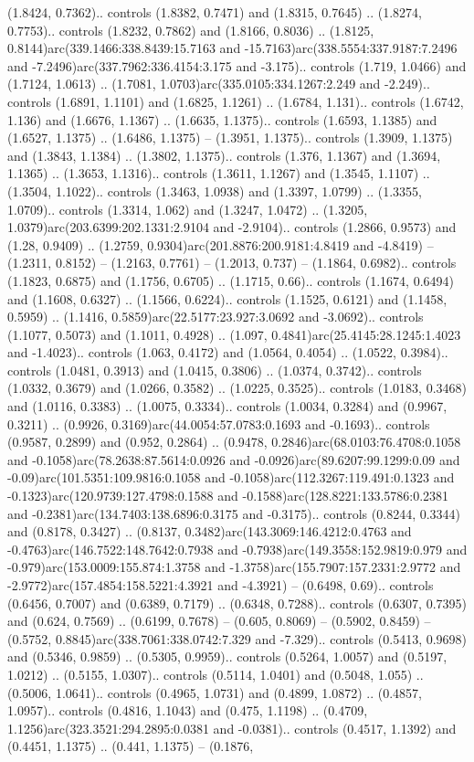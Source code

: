 (1.8424, 0.7362).. controls (1.8382, 0.7471) and (1.8315, 0.7645) .. (1.8274, 0.7753).. controls (1.8232, 0.7862) and (1.8166, 0.8036) .. (1.8125, 0.8144)arc(339.1466:338.8439:15.7163 and -15.7163)arc(338.5554:337.9187:7.2496 and -7.2496)arc(337.7962:336.4154:3.175 and -3.175).. controls (1.719, 1.0466) and (1.7124, 1.0613) .. (1.7081, 1.0703)arc(335.0105:334.1267:2.249 and -2.249).. controls (1.6891, 1.1101) and (1.6825, 1.1261) .. (1.6784, 1.131).. controls (1.6742, 1.136) and (1.6676, 1.1367) .. (1.6635, 1.1375).. controls (1.6593, 1.1385) and (1.6527, 1.1375) .. (1.6486, 1.1375) -- (1.3951, 1.1375).. controls (1.3909, 1.1375) and (1.3843, 1.1384) .. (1.3802, 1.1375).. controls (1.376, 1.1367) and (1.3694, 1.1365) .. (1.3653, 1.1316).. controls (1.3611, 1.1267) and (1.3545, 1.1107) .. (1.3504, 1.1022).. controls (1.3463, 1.0938) and (1.3397, 1.0799) .. (1.3355, 1.0709).. controls (1.3314, 1.062) and (1.3247, 1.0472) .. (1.3205, 1.0379)arc(203.6399:202.1331:2.9104 and -2.9104).. controls (1.2866, 0.9573) and (1.28, 0.9409) .. (1.2759, 0.9304)arc(201.8876:200.9181:4.8419 and -4.8419) -- (1.2311, 0.8152) -- (1.2163, 0.7761) -- (1.2013, 0.737) -- (1.1864, 0.6982).. controls (1.1823, 0.6875) and (1.1756, 0.6705) .. (1.1715, 0.66).. controls (1.1674, 0.6494) and (1.1608, 0.6327) .. (1.1566, 0.6224).. controls (1.1525, 0.6121) and (1.1458, 0.5959) .. (1.1416, 0.5859)arc(22.5177:23.927:3.0692 and -3.0692).. controls (1.1077, 0.5073) and (1.1011, 0.4928) .. (1.097, 0.4841)arc(25.4145:28.1245:1.4023 and -1.4023).. controls (1.063, 0.4172) and (1.0564, 0.4054) .. (1.0522, 0.3984).. controls (1.0481, 0.3913) and (1.0415, 0.3806) .. (1.0374, 0.3742).. controls (1.0332, 0.3679) and (1.0266, 0.3582) .. (1.0225, 0.3525).. controls (1.0183, 0.3468) and (1.0116, 0.3383) .. (1.0075, 0.3334).. controls (1.0034, 0.3284) and (0.9967, 0.3211) .. (0.9926, 0.3169)arc(44.0054:57.0783:0.1693 and -0.1693).. controls (0.9587, 0.2899) and (0.952, 0.2864) .. (0.9478, 0.2846)arc(68.0103:76.4708:0.1058 and -0.1058)arc(78.2638:87.5614:0.0926 and -0.0926)arc(89.6207:99.1299:0.09 and -0.09)arc(101.5351:109.9816:0.1058 and -0.1058)arc(112.3267:119.491:0.1323 and -0.1323)arc(120.9739:127.4798:0.1588 and -0.1588)arc(128.8221:133.5786:0.2381 and -0.2381)arc(134.7403:138.6896:0.3175 and -0.3175).. controls (0.8244, 0.3344) and (0.8178, 0.3427) .. (0.8137, 0.3482)arc(143.3069:146.4212:0.4763 and -0.4763)arc(146.7522:148.7642:0.7938 and -0.7938)arc(149.3558:152.9819:0.979 and -0.979)arc(153.0009:155.874:1.3758 and -1.3758)arc(155.7907:157.2331:2.9772 and -2.9772)arc(157.4854:158.5221:4.3921 and -4.3921) -- (0.6498, 0.69).. controls (0.6456, 0.7007) and (0.6389, 0.7179) .. (0.6348, 0.7288).. controls (0.6307, 0.7395) and (0.624, 0.7569) .. (0.6199, 0.7678) -- (0.605, 0.8069) -- (0.5902, 0.8459) -- (0.5752, 0.8845)arc(338.7061:338.0742:7.329 and -7.329).. controls (0.5413, 0.9698) and (0.5346, 0.9859) .. (0.5305, 0.9959).. controls (0.5264, 1.0057) and (0.5197, 1.0212) .. (0.5155, 1.0307).. controls (0.5114, 1.0401) and (0.5048, 1.055) .. (0.5006, 1.0641).. controls (0.4965, 1.0731) and (0.4899, 1.0872) .. (0.4857, 1.0957).. controls (0.4816, 1.1043) and (0.475, 1.1198) .. (0.4709, 1.1256)arc(323.3521:294.2895:0.0381 and -0.0381).. controls (0.4517, 1.1392) and (0.4451, 1.1375) .. (0.441, 1.1375) -- (0.1876, 
